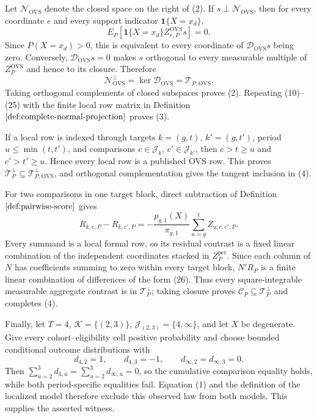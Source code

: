 Let \(\mathcal N_{\mathrm{OVS}}\) denote the closed space on the right of (2).  If \(s\perp\mathcal N_{\mathrm{OVS}}\), then for every coordinate \(e\) and every support indicator \(\mathbf 1\{X=x_d\}\),
\[
E_P[\mathbf 1\{X=x_d\}Z^{\mathrm{OVS}}_{e,P}s]=0.
\]
Since \(P(X=x_d)>0\), this is equivalent to every coordinate of \(\mathscr D_{\mathrm{OVS}}s\) being zero.  Conversely, \(\mathscr D_{\mathrm{OVS}}s=0\) makes \(s\) orthogonal to every measurable multiple of \(Z_P^{\mathrm{OVS}}\) and hence to its closure.  Therefore
\[
\mathcal N_{\mathrm{OVS}}^\perp
=\ker\mathscr D_{\mathrm{OVS}}
=\mathcal T_{P,\mathrm{OVS}}.
\]
Taking orthogonal complements of closed subspaces proves (2).  Repeating (10)--(25) with the finite local row matrix in Definition \(\ref{def:complete-normal-projection}\) proves (3).

If a local row is indexed through targets \(k=(g,t)\), \(k'=(g,t')\), period \(u\le\min(t,t')\), and comparisons \(c\in\mathcal J_k\), \(c'\in\mathcal J_{k'}\), then \(c>t\ge u\) and \(c'>t'\ge u\).  Hence every local row is a published OVS row.  This proves \(\mathcal T_P^\perp\subseteq\mathcal T_{P,\mathrm{OVS}}^\perp\), and orthogonal complementation gives the tangent inclusion in (4).

For two comparisons in one target block, direct subtraction of Definition \(\ref{def:pairwise-score}\) gives
\[
R_{k,c,P}-R_{k,c',P}
=-\frac{p_{g,1}(X)}{\pi_{g,1}}
\sum_{u=g}^t Z_{u;c,c',P}.
\tag{26}
\]
Every summand is a local formal row, so its residual contrast is a fixed linear combination of the independent coordinates stacked in \(Z_P^{\mathrm{per}}\).  Since each column of \(N\) has coefficients summing to zero within every target block, \(N'R_P\) is a finite linear combination of differences of the form (26).  Thus every square-integrable measurable aggregate contrast is in \(\mathcal T_P^\perp\); taking closure proves \(\mathcal C_P\subseteq\mathcal T_P^\perp\) and completes (4).

Finally, let \(T=4\), \(\mathcal K=\{(2,3)\}\), \(\mathcal J_{(2,3)}=\{4,\infty\}\), and let \(X\) be degenerate.  Give every cohort--eligibility cell positive probability and choose bounded conditional outcome distributions with
\[
d_{4,2}=1,\qquad d_{4,3}=-1,
\qquad d_{\infty,2}=d_{\infty,3}=0.
\]
Then \(\sum_{u=2}^3d_{4,u}=\sum_{u=2}^3d_{\infty,u}=0\), so the cumulative comparison equality holds, while both period-specific equalities fail.  Equation (1) and the definition of the localized model therefore exclude this observed law from both models.  This supplies the asserted witness.

